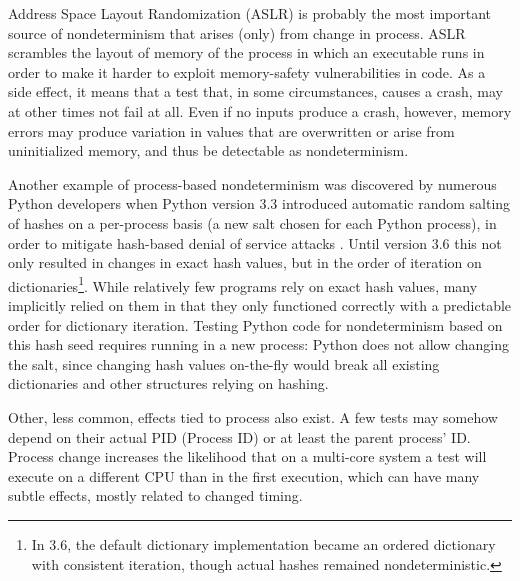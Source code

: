 Address Space Layout Randomization (ASLR) \cite{ASLR}  is probably the most
important source of nondeterminism that arises (only) from change in
process.  ASLR scrambles the layout of memory of the process in which
an executable runs in order to make it harder to exploit memory-safety
vulnerabilities in code.  As a side effect, it
means that a test that, in some circumstances, causes a crash, may at
other times not fail at all.  Even if no inputs produce a crash,
however, memory errors may produce variation in values that are
overwritten or arise from uninitialized memory, and thus be detectable
as nondeterminism.

Another example of process-based nondeterminism was discovered by numerous Python developers when Python
version 3.3 introduced automatic random salting of hashes on a
per-process basis (a new salt chosen for each Python process),
in order to mitigate hash-based denial of service attacks
\cite{denial}.  Until version 3.6 this not only resulted in changes in
exact hash values, but in the order of iteration on
dictionaries\footnote{In 3.6, the default dictionary
  implementation became an ordered dictionary with consistent
  iteration, though actual hashes remained nondeterministic.}.  While
relatively few programs rely on exact hash values, many implicitly
relied on them in that they only functioned correctly with a
predictable order for dictionary iteration.  Testing
Python code for nondeterminism based on this hash seed requires
running in a new process:  Python does not allow changing the salt, since changing hash values on-the-fly would
break all existing dictionaries and other structures relying on
hashing.

Other, less common, effects tied to process also exist.  A few tests
may somehow depend on their actual PID (Process ID) or at least the
parent process' ID.  Process change increases the likelihood that on a multi-core
system a test will execute on a different CPU than in the first
execution, which can have many subtle effects, mostly related to
changed timing.


